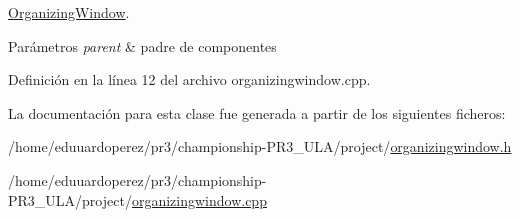 \hyperlink{class_organizing_window}{Organizing\+Window}. 


\begin{DoxyParams}{Parámetros}
{\em parent} & padre de componentes \\
\hline
\end{DoxyParams}


Definición en la línea 12 del archivo organizingwindow.\+cpp.



La documentación para esta clase fue generada a partir de los siguientes ficheros\+:\begin{DoxyCompactItemize}
\item 
/home/eduuardoperez/pr3/championship-\/\+P\+R3\+\_\+\+U\+L\+A/project/\hyperlink{organizingwindow_8h}{organizingwindow.\+h}\item 
/home/eduuardoperez/pr3/championship-\/\+P\+R3\+\_\+\+U\+L\+A/project/\hyperlink{organizingwindow_8cpp}{organizingwindow.\+cpp}\end{DoxyCompactItemize}
